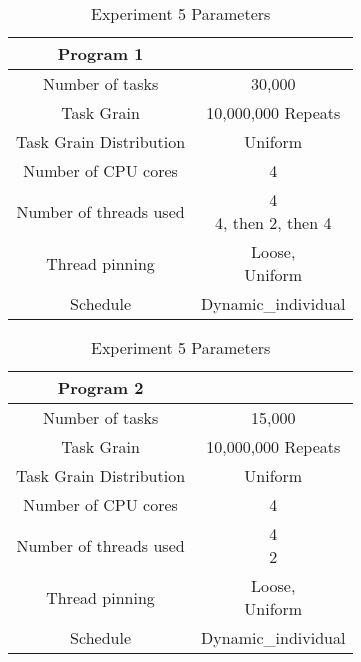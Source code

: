 \begin{table}
\centering
 \begin{tabular}{|c|c|}
  \hline
  Program 1 & \\
  \hline
  Number of tasks & 30,000 \\
  \hline
  Task Grain & 10,000,000 Repeats \\
  \hline
  Task Grain Distribution & Uniform \\
  \hline
  Number of CPU cores & 4 \\
  \hline
  Number of threads used & \specialcell{4 \\ 4, then 2, then 4} \\
  \hline
  Thread pinning & \specialcell{Loose, \\ Uniform} \\
  \hline
  Schedule & Dynamic\_individual \\
  \hline
 \end{tabular}

 \begin{tabular}{|c|c|}
  \hline
  Program 2 & \\
  \hline
  Number of tasks & 15,000 \\
  \hline
  Task Grain & 10,000,000 Repeats \\
  \hline
  Task Grain Distribution & Uniform \\
  \hline
  Number of CPU cores & 4 \\
  \hline
  Number of threads used & \specialcell{4 \\ 2} \\
  \hline
  Thread pinning & \specialcell{Loose, \\ Uniform} \\
  \hline
  Schedule & Dynamic\_individual \\
  \hline
 \end{tabular}
\caption{Experiment 5 Parameters}
\iflabele
\label{table:evaluation_ex5_parameters}
\fi
{}
\end{table}
